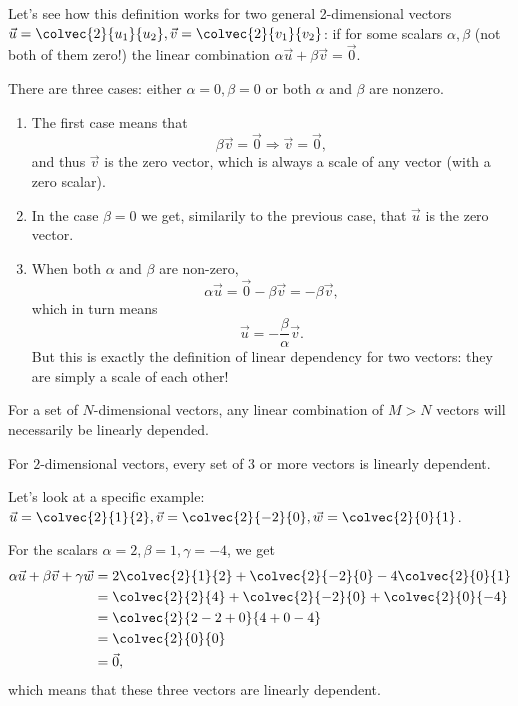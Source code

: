 \begin{example}
  Let's see how this definition works for two general 2-dimensional vectors $\vec{u}=\colvec{2}{u_{1}}{u_{2}}, \vec{v}=\colvec{2}{v_{1}}{v_{2}}$: if for some scalars $\alpha, \beta$ (not both of them zero!) the linear combination $\alpha\vec{u} + \beta\vec{v} = \vec{0}$.
  
There are three cases: either $\alpha=0, \beta=0$ or both $\alpha$ and $\beta$ are nonzero.\\
\begin{enumerate}
  \item The first case means that
  \begin{equation*}
  \beta\vec{v} = \vec{0} \Rightarrow \vec{v}=\vec{0},
  \end{equation*}
  and thus $\vec{v}$ is the zero vector, which is always a scale of any vector (with a zero scalar).

  \item In the case $\beta=0$ we get, similarily to the previous case, that $\vec{u}$ is the zero vector.
  \item When both $\alpha$ and $\beta$ are non-zero,
  \begin{equation*}
  \alpha\vec{u} = \vec{0} - \beta\vec{v} = -\beta\vec{v},
  \end{equation*}
  which in turn means
  \begin{equation*}
  \vec{u} = -\frac{\beta}{\alpha}\vec{v}.
  \end{equation*}
  But this is exactly the definition of linear dependency for two vectors: they are simply a scale of each other!
\end{enumerate}
\end{example}

For a set of $N$-dimensional vectors, any linear combination of $M>N$ vectors will necessarily be linearly depended.

\begin{example}
  For $2$-dimensional vectors, every set of $3$ or more vectors is linearly dependent.
  
  Let's look at a specific example: $\vec{u}=\colvec{2}{1}{2},\vec{v}=\colvec{2}{-2}{0},\vec{w}=\colvec{2}{0}{1}$.

  For the scalars $\alpha=2,\beta=1,\gamma=-4$, we get
  \begin{align*}
  \alpha\vec{u}+\beta\vec{v}+\gamma\vec{w} &= 2\colvec{2}{1}{2} + \colvec{2}{-2}{0} -4\colvec{2}{0}{1}\\
  &= \colvec{2}{2}{4} + \colvec{2}{-2}{0} + \colvec{2}{0}{-4}\\
  &= \colvec{2}{2-2+0}{4+0-4}\\
  &= \colvec{2}{0}{0}\\
  &= \vec{0},
  \end{align*}
  which means that these three vectors are linearly dependent.
\end{example}

